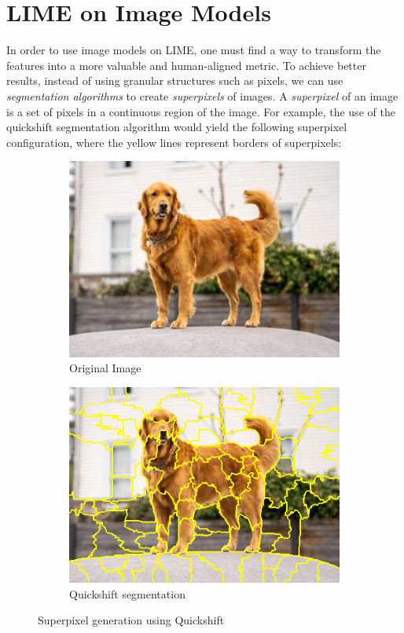 \section{LIME on Image Models}

In order to use image models on LIME, one must find a way to transform the features into a more valuable and human-aligned metric. 
To achieve better results, instead of using granular structures such as pixels, we can use \emph{segmentation algorithms} to create \emph{superpixels} of images.
A \emph{superpixel} of an image is a set of pixels in a continuous region of the image. 
For example, the use of the quickshift segmentation algorithm would yield the following superpixel configuration, where the yellow lines represent borders of superpixels:

\newpage

\begin{figure}
    \captionsetup{justification=centering}

    \begin{subfigure}[t]{0.48\textwidth}
        \captionsetup{justification=centering}
        \centering
        \includegraphics[width=.7\linewidth]{figuras/lime/dog.jpg}
        \caption{Original Image}
    \end{subfigure}
    \hfill
    \begin{subfigure}[t]{0.48\textwidth}
        \captionsetup{justification=centering}
        \centering
        \includegraphics[width=.7\linewidth]{figuras/lime/segmentation_dog.png}
        \caption{Quickshift segmentation}
    \end{subfigure}
    \caption{Superpixel generation using Quickshift}
    \label{fig:superpixel_quickshift}
\end{figure}

